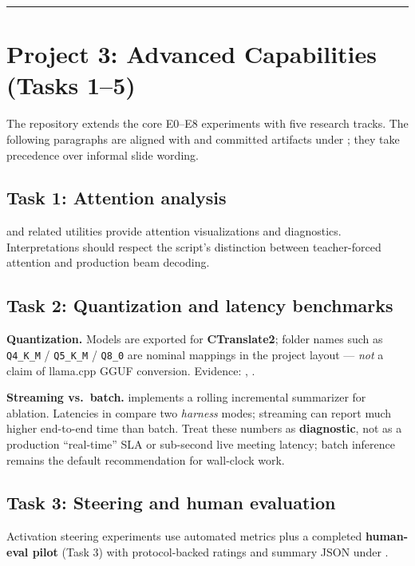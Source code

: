 \documentclass[11pt,a4paper]{article}
\newcommand{\sectionrule}{\vspace{6pt}\hrule\vspace{10pt}}
\begin{document}
\sectionrule

\section{Project 3: Advanced Capabilities (Tasks 1--5)}

The repository extends the core E0--E8 experiments with five research tracks. The following paragraphs are aligned with  and committed artifacts under ; they take precedence over informal slide wording.

\subsection{Task 1: Attention analysis}

 and related utilities provide attention visualizations and diagnostics. Interpretations should respect the script's distinction between teacher-forced attention and production beam decoding.

\subsection{Task 2: Quantization and latency benchmarks}

\textbf{Quantization.} Models are exported for \textbf{CTranslate2}; folder names such as \texttt{Q4\_K\_M} / \texttt{Q5\_K\_M} / \texttt{Q8\_0} are nominal mappings in the project layout --- \emph{not} a claim of llama.cpp GGUF conversion. Evidence: , .

\textbf{Streaming vs.\ batch.}  implements a rolling incremental summarizer for ablation. Latencies in  compare two \emph{harness} modes; streaming can report much higher end-to-end time than batch. Treat these numbers as \textbf{diagnostic}, not as a production ``real-time'' SLA or sub-second live meeting latency; batch inference remains the default recommendation for wall-clock work.

\subsection{Task 3: Steering and human evaluation}

Activation steering experiments use automated metrics plus a completed \textbf{human-eval pilot} (Task 3) with protocol-backed ratings and summary JSON under .
\end{document}
